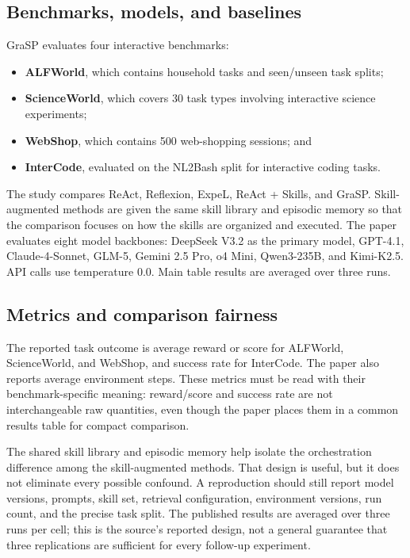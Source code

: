 \subsection{Benchmarks, models, and baselines}

GraSP evaluates four interactive benchmarks:

\begin{itemize}
  \item \textbf{ALFWorld}, which contains household tasks and seen/unseen task splits;
  \item \textbf{ScienceWorld}, which covers 30 task types involving interactive science experiments;
  \item \textbf{WebShop}, which contains 500 web-shopping sessions; and
  \item \textbf{InterCode}, evaluated on the NL2Bash split for interactive coding tasks.
\end{itemize}

The study compares ReAct, Reflexion, ExpeL, ReAct + Skills, and GraSP. Skill-augmented methods are given the same skill library and episodic memory so that the comparison focuses on how the skills are organized and executed. The paper evaluates eight model backbones: DeepSeek V3.2 as the primary model, GPT-4.1, Claude-4-Sonnet, GLM-5, Gemini 2.5 Pro, o4 Mini, Qwen3-235B, and Kimi-K2.5. API calls use temperature 0.0. Main table results are averaged over three runs.\autocite{xia2026grasp}

\subsection{Metrics and comparison fairness}

The reported task outcome is average reward or score for ALFWorld, ScienceWorld, and WebShop, and success rate for InterCode. The paper also reports average environment steps. These metrics must be read with their benchmark-specific meaning: reward/score and success rate are not interchangeable raw quantities, even though the paper places them in a common results table for compact comparison.

The shared skill library and episodic memory help isolate the orchestration difference among the skill-augmented methods. That design is useful, but it does not eliminate every possible confound. A reproduction should still report model versions, prompts, skill set, retrieval configuration, environment versions, run count, and the precise task split. The published results are averaged over three runs per cell; this is the source's reported design, not a general guarantee that three replications are sufficient for every follow-up experiment.\autocite{xia2026grasp}

